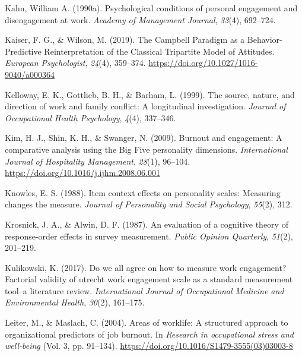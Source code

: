 \documentclass[
  man]{apa6}
\newlength{\cslhangindent}
\newlength{\cslentryspacingunit} %
\newenvironment{CSLReferences}[2] %
 {%
  \setlength{\parindent}{0pt}
  \ifodd #1
  \let\oldpar\par
  \def\par{\hangindent=\cslhangindent\oldpar}
  \fi
  \setlength{\parskip}{#2\cslentryspacingunit}
 }%
 {}
\begin{document}
\begin{CSLReferences}{1}{0}
\leavevmode{}%
Kahn, William A. (1990a). Psychological conditions of personal engagement and disengagement at work. \emph{Academy of Management Journal}, \emph{33}(4), 692--724.

\leavevmode{}%
Kaiser, F. G., \& Wilson, M. (2019). The {Campbell} {Paradigm} as a {Behavior}-{Predictive} {Reinterpretation} of the {Classical} {Tripartite} {Model} of {Attitudes}. \emph{European Psychologist}, \emph{24}(4), 359--374. \url{https://doi.org/10.1027/1016-9040/a000364}

\leavevmode{}%
Kelloway, E. K., Gottlieb, B. H., \& Barham, L. (1999). The source, nature, and direction of work and family conflict: A longitudinal investigation. \emph{Journal of Occupational Health Psychology}, \emph{4}(4), 337--346.

\leavevmode{}%
Kim, H. J., Shin, K. H., \& Swanger, N. (2009). Burnout and engagement: {A} comparative analysis using the {Big} {Five} personality dimensions. \emph{International Journal of Hospitality Management}, \emph{28}(1), 96--104. \url{https://doi.org/10.1016/j.ijhm.2008.06.001}

\leavevmode{}%
Knowles, E. S. (1988). Item context effects on personality scales: Measuring changes the measure. \emph{Journal of Personality and Social Psychology}, \emph{55}(2), 312.

\leavevmode{}%
Krosnick, J. A., \& Alwin, D. F. (1987). An evaluation of a cognitive theory of response-order effects in survey measurement. \emph{Public Opinion Quarterly}, \emph{51}(2), 201--219.

\leavevmode{}%
Kulikowski, K. (2017). Do we all agree on how to measure work engagement? Factorial validity of utrecht work engagement scale as a standard measurement tool--a literature review. \emph{International Journal of Occupational Medicine and Environmental Health}, \emph{30}(2), 161--175.

\leavevmode{}%
Leiter, M., \& Maslach, C. (2004). Areas of worklife: A structured approach to organizational predictors of job burnout. In \emph{Research in occupational stress and well-being} (Vol. 3, pp. 91--134). \url{https://doi.org/10.1016/S1479-3555(03)03003-8}


\end{CSLReferences}
\end{document}
